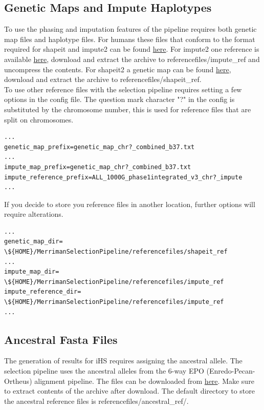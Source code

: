 \documentclass[a4paper,10pt]{article}
\begin{document}
\subsection{Genetic Maps and Impute Haplotypes}
To use the phasing and imputation features of the pipeline requires both genetic map files and haplotype files. For humans these files that conform to the format required for shapeit and impute2 can be found \href{http://mathgen.stats.ox.ac.uk/impute/impute_v2.html#reference}{here}. For impute2 one reference is available \href{http://mathgen.stats.ox.ac.uk/impute/ALL_1000G_phase1integrated_v3_impute_macGT1.tgz}{here}, download and extract the archive to referencefiles/impute\_ref and uncompress the contents. For shapeit2 a genetic map can be found \href{http://www.shapeit.fr/files/genetic_map_b37.tar.gz}{here}, download and extract the archive to referencefiles/shapeit\_ref.\\

To use other reference files with the selection pipeline requires setting a few options in the config file. The question mark character "?" in the config is substituted by the chromosome number, this is used for reference files that are split on chromosomes.\\
\begin{verbatim}
...
genetic_map_prefix=genetic_map_chr?_combined_b37.txt
...
impute_map_prefix=genetic_map_chr?_combined_b37.txt
impute_reference_prefix=ALL_1000G_phase1integrated_v3_chr?_impute
...
\end{verbatim}

If you decide to store you reference files in another location, further options will require alterations.\\ 
\begin{verbatim}
...
genetic_map_dir= \${HOME}/MerrimanSelectionPipeline/referencefiles/shapeit_ref
...
impute_map_dir= \${HOME}/MerrimanSelectionPipeline/referencefiles/impute_ref
impute_reference_dir= \${HOME}/MerrimanSelectionPipeline/referencefiles/impute_ref
...
\end{verbatim}

\subsection{Ancestral Fasta Files}
The generation of results for iHS requires assigning the ancestral allele. The selection pipeline uses the ancestral alleles from the 6-way EPO (Enredo-Pecan-Ortheus) alignment pipeline. The files can be downloaded from \href{ftp://ftp.1000genomes.ebi.ac.uk/vol1/ftp/phase1/analysis_results/supporting/ancestral_alignments/human_ancestor_GRCh37_e59.tar.bz2}{here}. Make sure to extract contents of the archive after download. The default directory to store the ancestral reference files is referencefiles/ancestral\_ref/.
\end{document}
